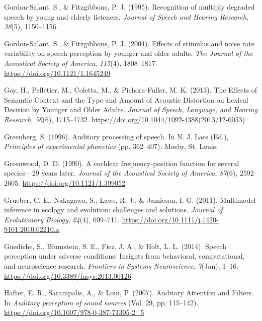 \documentclass[a4paper, nobind]{templates/ociamthesis}
\newlength{\cslhangindent}
\newenvironment{CSLReferences}[2] %
 {%
  \setlength{\parindent}{0pt}
  \ifodd #1
  \let\oldpar\par
  \def\par{\hangindent=\cslhangindent\oldpar}
  \fi
  \setlength{\parskip}{1mm}
  \setlength{\baselineskip}{6mm}
 }%
 {}
\begin{document}
\begin{CSLReferences}{1}{0}
\leavevmode{}%
Gordon-Salant, S., \& Fitzgibbons, P. J. (1995). {Recognition of multiply degraded speech by young and elderly listeners}. \emph{Journal of Speech and Hearing Research}, \emph{38}(5), 1150--1156.

\leavevmode{}%
Gordon-Salant, S., \& Fitzgibbons, P. J. (2004). {Effects of stimulus and noise rate variability on speech perception by younger and older adults}. \emph{The Journal of the Acoustical Society of America}, \emph{115}(4), 1808--1817. \url{https://doi.org/10.1121/1.1645249}

\leavevmode{}%
Goy, H., Pelletier, M., Coletta, M., \& Pichora-Fuller, M. K. (2013). {The Effects of Semantic Context and the Type and Amount of Acoustic Distortion on Lexical Decision by Younger and Older Adults}. \emph{Journal of Speech, Language, and Hearing Research}, \emph{56}(6), 1715--1732. \url{https://doi.org/10.1044/1092-4388(2013/12-0053)}

\leavevmode{}%
Greenberg, S. (1996). Auditory processing of speech. In N. J. Lass (Ed.), \emph{Principles of experimental phonetics} (pp. 362--407). Mosby, St. Louis.

\leavevmode{}%
Greenwood, D. D. (1990). {A cochlear frequency-position function for several species---29 years later}. \emph{Journal of the Acoustical Society of America}, \emph{87}(6), 2592--2605. \url{https://doi.org/10.1121/1.399052}

\leavevmode{}%
Grueber, C. E., Nakagawa, S., Laws, R. J., \& Jamieson, I. G. (2011). Multimodel inference in ecology and evolution: challenges and solutions. \emph{Journal of Evolutionary Biology}, \emph{24}(4), 699--711. \url{https://doi.org/10.1111/j.1420-9101.2010.02210.x}

\leavevmode{}%
Guediche, S., Blumstein, S. E., Fiez, J. A., \& Holt, L. L. (2014). {Speech perception under adverse conditions: Insights from behavioral, computational, and neuroscience research}. \emph{Frontiers in Systems Neuroscience}, \emph{7}(Jan), 1--16. \url{https://doi.org/10.3389/fnsys.2013.00126}

\leavevmode{}%
Hafter, E. R., Sarampalis, A., \& Loui, P. (2007). {Auditory Attention and Filters}. In \emph{Auditory perception of sound sources} (Vol. 29, pp. 115--142). \url{https://doi.org/10.1007/978-0-387-71305-2_5}


\end{CSLReferences}
\end{document}
